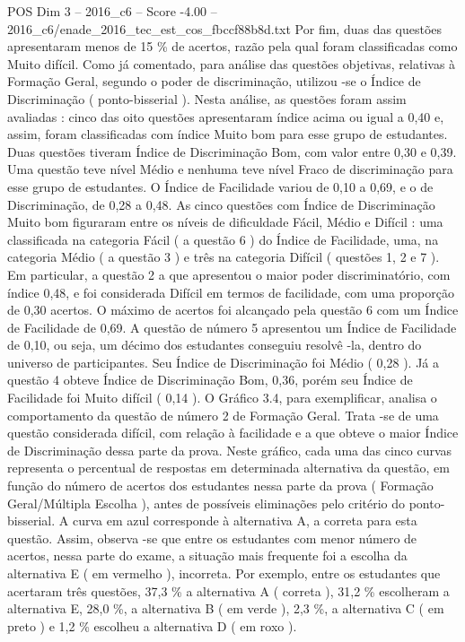 \begin{textsample}{POS Dim 3 – 2016\_c6 – Score -4.00 – 2016\_c6/enade\_2016\_tec\_est\_cos\_fbccf88b8d.txt}
Por fim, duas das questões apresentaram menos de 15 \% de acertos, razão pela qual foram classificadas como Muito difícil.
Como já comentado, para análise das questões objetivas, relativas à Formação Geral, segundo o poder de discriminação, utilizou -se o Índice de Discriminação ( ponto-bisserial ).
Nesta análise, as questões foram assim avaliadas : cinco das oito questões apresentaram índice acima ou igual a 0,40 e, assim, foram classificadas com índice Muito bom para esse grupo de estudantes.
Duas questões tiveram Índice de Discriminação Bom, com valor entre 0,30 e 0,39.
Uma questão teve nível Médio e nenhuma teve nível Fraco de discriminação para esse grupo de estudantes.
O Índice de Facilidade variou de 0,10 a 0,69, e o de Discriminação, de 0,28 a 0,48.
As cinco questões com Índice de Discriminação Muito bom figuraram entre os níveis de dificuldade Fácil, Médio e Difícil : uma classificada na categoria Fácil ( a questão 6 ) do Índice de Facilidade, uma, na categoria Médio ( a questão 3 ) e três na categoria Difícil ( questões 1, 2 e 7 ).
Em particular, a questão 2 a que apresentou o maior poder discriminatório, com índice 0,48, e foi considerada Difícil em termos de facilidade, com uma proporção de 0,30 acertos.
O máximo de acertos foi alcançado pela questão 6 com um Índice de Facilidade de 0,69.
A questão de número 5 apresentou um Índice de Facilidade de 0,10, ou seja, um décimo dos estudantes conseguiu resolvê -la, dentro do universo de participantes.
Seu Índice de Discriminação foi Médio ( 0,28 ).
Já a questão 4 obteve Índice de Discriminação Bom, 0,36, porém seu Índice de Facilidade foi Muito difícil ( 0,14 ).
O Gráfico 3.4, para exemplificar, analisa o comportamento da questão de número 2 de Formação Geral.
Trata -se de uma questão considerada difícil, com relação à facilidade e a que obteve o maior Índice de Discriminação dessa parte da prova.
Neste gráfico, cada uma das cinco curvas representa o percentual de respostas em determinada alternativa da questão, em função do número de acertos dos estudantes nessa parte da prova ( Formação Geral/Múltipla Escolha ), antes de possíveis eliminações pelo critério do ponto-bisserial.
A curva em azul corresponde à alternativa A, a correta para esta questão.
Assim, observa -se que entre os estudantes com menor número de acertos, nessa parte do exame, a situação mais frequente foi a escolha da alternativa E ( em vermelho ), incorreta.
Por exemplo, entre os estudantes que acertaram três questões, 37,3 \% a alternativa A ( correta ), 31,2 \% escolheram a alternativa E, 28,0 \%, a alternativa B ( em verde ), 2,3 \%, a alternativa C ( em preto ) e 1,2 \% escolheu a alternativa D ( em roxo ).

\end{textsample}
